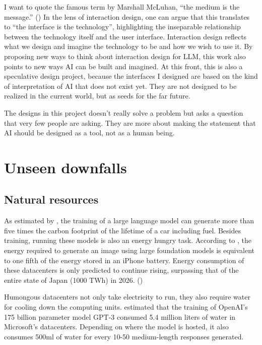 \documentclass[12pt]{article}
\begin{document}
I want to quote the famous term by Marshall McLuhan, “the medium is the message.” (\cite{medium}) In the lens of interaction design, one can argue that this translates to “the interface is the technology”, highlighting the inseparable relationship between the technology itself and the user interface. Interaction design reflects what we design and imagine the technology to be and how we wish to use it. By proposing new ways to think about interaction design for LLM, this work also points to new ways AI can be built and imagined. At this front, this is also a speculative design project, because the interfaces I designed are based on the kind of interpretation of AI that does not exist yet. They are not designed to be realized in the current world, but as seeds for the far future.

The designs in this project doesn't really solve a problem but asks a question that very few people are asking. They are more about making the statement that AI should be designed as a tool, not as a human being.


\section{Unseen downfalls} \label{issues}

\subsection{Natural resources}
As estimated by \cite{strubell-etal-2019-energy}, the training of a large language model can generate more than five times the carbon footprint of the lifetime of a car including fuel. Besides training, running these models is also an energy hungry task. According to \cite{10.1145/3630106.3658542}, the energy required to generate an image using large foundation models is equivalent to one fifth of the energy stored in an iPhone battery. Energy consumption of these datacenters is only predicted to continue rising, surpassing that of the entire state of Japan (1000 TWh) in 2026. (\cite{iea})

Humongous datacenters not only take electricity to run, they also require water for cooling down the computing units. \cite{10.1145/3724499} estimated that the training of OpenAI's 175 billion parameter model GPT-3 consumed 5.4 million liters of water in Microsoft's datacenters. Depending on where the model is hosted, it also consumes 500ml of water for every 10-50 medium-length responses generated.
\end{document}
